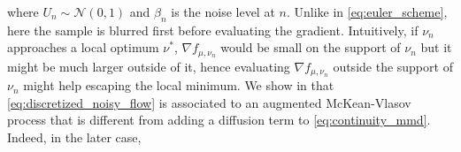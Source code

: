 where $U_n \sim \mathcal{N}(0,1)$ and $\beta_n$ is the noise level at $n$. Unlike in \cref{eq:euler_scheme}, here the sample is blurred first before evaluating the gradient.
Intuitively, if $\nu_n$ approaches a local optimum $\nu^{*}$, $ \nabla f_{\mu,\nu_n}$ would be small on the support of $\nu_n$ but it might be much larger outside of it, hence evaluating $\nabla f_{\mu,\nu_n}$ outside the support of $\nu_n$ might help escaping the local minimum. We show in  that \cref{eq:discretized_noisy_flow} is associated to an augmented McKean-Vlasov process that is different from adding a diffusion term to \cref{eq:continuity_mmd}. Indeed, in the later case, %
